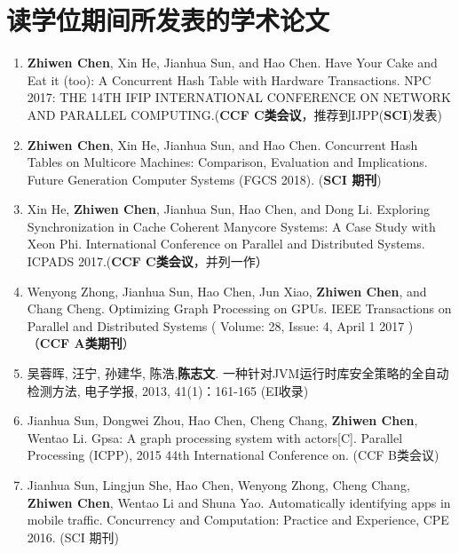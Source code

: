 \chapter{读学位期间所发表的学术论文}

\begin{enumerate}
\item \textbf{Zhiwen Chen}, Xin He, Jianhua Sun, and Hao Chen. Have Your Cake and Eat it (too): A Concurrent Hash Table with Hardware Transactions. NPC 2017: THE 14TH IFIP INTERNATIONAL CONFERENCE ON NETWORK AND PARALLEL COMPUTING.(\textbf{CCF C类会议}，推荐到IJPP(\textbf{SCI})发表)
\item \textbf{Zhiwen Chen}, Xin He, Jianhua Sun, and Hao Chen. Concurrent Hash Tables on Multicore Machines: Comparison, Evaluation and Implications. Future Generation Computer Systems (FGCS 2018). (\textbf{SCI 期刊})
\item Xin He, \textbf{Zhiwen Chen}, Jianhua Sun, Hao Chen, and Dong Li. Exploring Synchronization in Cache Coherent Manycore Systems: A Case Study with Xeon Phi. International Conference on Parallel and Distributed Systems. ICPADS 2017.(\textbf{CCF C类会议}，并列一作）
\item Wenyong Zhong, Jianhua Sun, Hao Chen, Jun Xiao, \textbf{Zhiwen Chen}, and Chang Cheng. Optimizing Graph Processing on GPUs. IEEE Transactions on Parallel and Distributed Systems ( Volume: 28, Issue: 4, April 1 2017 ) （\textbf{CCF A类期刊}）
\item 吴蓉晖, 汪宁, 孙建华, 陈浩,\textbf{陈志文}. 一种针对JVM运行时库安全策略的全自动检测方法, 电子学报, 2013, 41(1)：161-165 (EI收录)
\item Jianhua Sun, Dongwei Zhou, Hao Chen, Cheng Chang, \textbf{Zhiwen Chen}, Wentao Li. Gpsa: A graph processing system with actors[C]. Parallel Processing (ICPP), 2015 44th International Conference on. (CCF B类会议)
 \item Jianhua Sun, Lingjun She, Hao Chen, Wenyong Zhong, Cheng Chang, \textbf{Zhiwen Chen}, Wentao Li and Shuna Yao. Automatically identifying apps in mobile traffic. Concurrency and Computation: Practice and Experience, CPE 2016. (SCI 期刊)
\end{enumerate}


